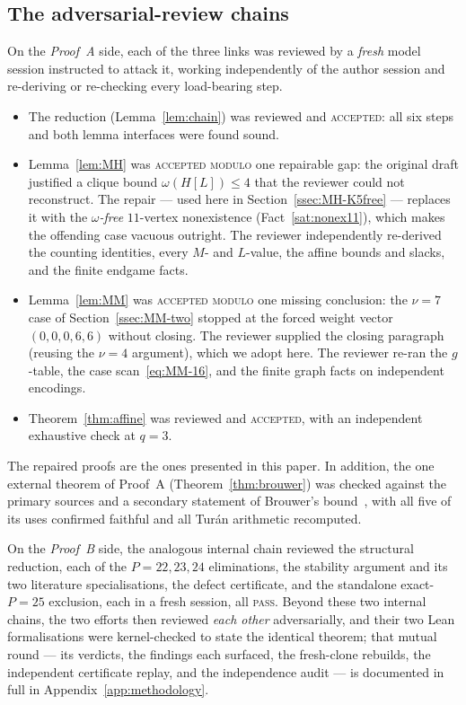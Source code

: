 \documentclass[11pt,reqno]{amsart}
\theoremstyle{definition}
\theoremstyle{remark}
\begin{document}
\subsection{The adversarial-review chains}
On the \emph{Proof~A} side, each of the three links was reviewed by a \emph{fresh} model
session instructed to attack it, working independently of the author session and
re-deriving or re-checking every load-bearing step.
\begin{itemize}[nosep]
\item The reduction (Lemma~\ref{lem:chain}) was reviewed and \textsc{accepted}: all
six steps and both lemma interfaces were found sound.
\item Lemma~\ref{lem:MH} was \textsc{accepted modulo} one repairable gap: the
original draft justified a clique bound $\omega(H[L])\le 4$ that the reviewer could
not reconstruct. The repair --- used here in Section~\ref{ssec:MH-K5free} --- replaces
it with the \emph{$\omega$-free} $11$-vertex nonexistence (Fact~\ref{sat:nonex11}),
which makes the offending case vacuous outright. The reviewer independently
re-derived the counting identities, every $M$- and $L$-value, the affine bounds and
slacks, and the finite endgame facts.
\item Lemma~\ref{lem:MM} was \textsc{accepted modulo} one missing conclusion: the
$\nu=7$ case of Section~\ref{ssec:MM-two} stopped at the forced weight vector
$(0,0,0,6,6)$ without closing. The reviewer supplied the closing paragraph (reusing
the $\nu=4$ argument), which we adopt here. The reviewer re-ran the $g$-table, the
case scan~\eqref{eq:MM-16}, and the finite graph facts on independent encodings.
\item Theorem~\ref{thm:affine} was reviewed and \textsc{accepted}, with an
independent exhaustive check at $q=3$.
\end{itemize}
The repaired proofs are the ones presented in this paper. In addition, the one
external theorem of Proof~A (Theorem~\ref{thm:brouwer}) was checked against the primary
sources \cite{KP05} and a secondary statement of Brouwer's bound~\cite{RWWY}, with all
five of its uses confirmed faithful and all Tur\'an arithmetic recomputed.

On the \emph{Proof~B} side, the analogous internal chain reviewed the structural
reduction, each of the $P=22,23,24$ eliminations, the stability argument and its two
literature specialisations, the defect certificate, and the standalone exact-$P=25$
exclusion, each in a fresh session, all \textsc{pass}. Beyond these two internal chains,
the two efforts then reviewed \emph{each other} adversarially, and their two Lean
formalisations were kernel-checked to state the identical theorem; that mutual round ---
its verdicts, the findings each surfaced, the fresh-clone rebuilds, the independent
certificate replay, and the independence audit --- is documented in full in
Appendix~\ref{app:methodology}.
\end{document}
